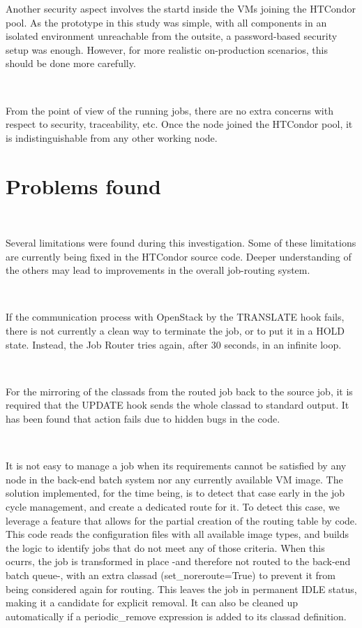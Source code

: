 \documentclass[a4paper]{jpconf}
\begin{document}
Another security aspect involves the startd inside the VMs joining the HTCondor pool. 
As the prototype in this study was simple, with all components in an isolated environment unreachable from the outsite, a password-based security setup was enough. 
However, for more realistic on-production scenarios, this should be done more carefully. 

~

From the point of view of the running jobs, there are no extra concerns with respect to security, traceability, etc. 
Once the node joined the HTCondor pool, it is indistinguishable from any other working node. 


\section{Problems found}

~

Several limitations were found during this investigation.
Some of these limitations are currently being fixed in the HTCondor source code.
Deeper understanding of the others may lead to improvements in the overall
job-routing system.

~

If the communication process with OpenStack by the TRANSLATE hook fails, 
there is not currently a clean way to terminate the job, or to put it in a HOLD
state. Instead, the Job Router tries again, after 30 seconds, in an infinite loop.

~

For the mirroring of the classads from the routed job back to the source job, 
it is required that the UPDATE hook sends the whole classad to standard output. 
It has been found that action fails due to hidden bugs in the code. 

~

It is not easy to manage a job when its requirements cannot be satisfied by any
node in the back-end batch system nor any currently available VM image. 
The solution implemented, for the time being, is to detect that case early in
the job cycle management, and create a dedicated route for it. 
To detect this case, we leverage a feature that allows for the partial creation of the routing table by code.
This code reads the configuration files with all available image types, and builds the logic to identify jobs that do not meet any of those criteria. 
When this ocurrs, the job is transformed in place -and therefore not routed to
the back-end batch queue-, with an extra classad (set\_noreroute=True) to prevent it from being considered again for routing.
This leaves the job in permanent IDLE status, making it a candidate for
explicit removal. It can also be cleaned up automatically if a
periodic\_remove expression is added to its classad definition.
\end{document}
